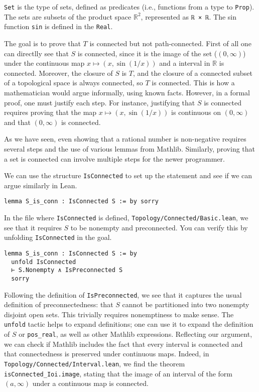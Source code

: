 \lstinline[language=lean]|Set| is the type of sets, defined as predicates
(i.e., functions from a type to \lstinline[language=lean]|Prop|).
The sets are subsets of the product space $\mathbb{R}^2$,
represented as \lstinline[language=lean]|ℝ × ℝ|.
The sin function \lstinline[language=lean]|sin| is defined in the
\lstinline[language=lean]|Real|.

The goal is to prove that $T$ is connected but not path-connected.
First of all one can directlly see that  $S$ is connected, since it is the
image of the set ($(0, \infty)$) under the continuous map
$x \mapsto (x, \sin(1/x))$ and a interval in $\mathbb{R}$ is connected.
Moreover, the closure of $S$ is $T$, and the closure of a connected subset of a topological space
is always connected,
so $T$ is connected.
This is how a mathematician would argue informally, using known facts.
However, in a formal proof, one must justify each step.
For instance, justifying that $S$ is connected
requires proving that the map
$x \mapsto (x, \sin(1/x))$ is continuous on $(0, \infty)$
and that $(0, \infty)$ is connected.

As we have seen, even showing that a rational number is non-negative
requires several steps and the use of various lemmas from Mathlib.
Similarly, proving that a set is connected can involve multiple steps
for the
newer programmer.


We can use the structure \lstinline[language=lean]|IsConnected|
to set up the statement and see if we can argue similarly in Lean.
\begin{lstlisting}[language=lean]
lemma S_is_conn : IsConnected S := by sorry
\end{lstlisting}
In the file where \lstinline[language=lean]|IsConnected| is defined,
\texttt{Topology/Connected/Basic.lean}, we see that it requires $S$ to be nonempty and preconnected.
You can verify this by unfolding \lstinline[language=lean]|IsConnected| in the goal.
\begin{lstlisting}[language=lean]
lemma S_is_conn : IsConnected S := by
  unfold IsConnected 
  ⊢ S.Nonempty ∧ IsPreconnected S
  sorry
\end{lstlisting}
Following the definition of \lstinline[language=lean]|IsPreconnected|, we see that it captures
the usual definition of preconnectedness: that $S$ cannot be
partitioned into two nonempty disjoint open sets. This trivially requires
nonemptiness to make sense.
The \lstinline[language=lean]|unfold| tactic helps to expand definitions; one can use it to expand the definition of $S$ or
\lstinline[language=lean]|pos_real|, as well as other Mathlib expressions.
Reflecting our argument, we can check if Mathlib includes the fact
that every interval
is connected and that connectedness is preserved
under continuous maps.
Indeed, in \texttt{Topology/Connected/Interval.lean}, we find the theorem
\lstinline[language=lean]|isConnected_Ioi.image|, stating that the image of an
interval of the form $(a, \infty)$
under a continuous map is connected.

